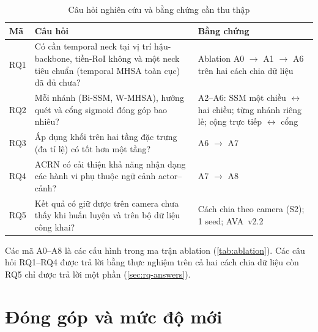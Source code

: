 \begin{table}[H]
\centering
\caption{Câu hỏi nghiên cứu và bằng chứng cần thu thập}
\label{tab:rq}
\begin{tabularx}{\textwidth}{lXX}
\toprule
\textbf{Mã} & \textbf{Câu hỏi} & \textbf{Bằng chứng}\\
\midrule
RQ1 & Có cần temporal neck tại vị trí hậu-backbone, tiền-RoI không và một neck tiêu chuẩn (temporal MHSA toàn cục) đã đủ chưa? & Ablation A0 $\rightarrow$ A1 $\rightarrow$ A6 trên hai cách chia dữ liệu\\
RQ2 & Mỗi nhánh (Bi-SSM, W-MHSA), hướng quét và cổng sigmoid đóng góp bao nhiêu? & A2--A6: SSM một chiều $\leftrightarrow$ hai chiều; từng nhánh riêng lẻ; cộng trực tiếp $\leftrightarrow$ cổng\\
RQ3 & Áp dụng khối trên hai tầng đặc trưng (đa tỉ lệ) có tốt hơn một tầng? & A6 $\rightarrow$ A7\\
RQ4 & ACRN có cải thiện khả năng nhận dạng các hành vi phụ thuộc ngữ cảnh actor--cảnh? & A7 $\rightarrow$ A8\\
RQ5 & Kết quả có giữ được trên camera chưa thấy khi huấn luyện và trên bộ dữ liệu công khai? & Cách chia theo camera (S2); 1 seed; AVA~v2.2\\
\bottomrule
\end{tabularx}
\end{table}

Các mã A0--A8 là các cấu hình trong ma trận ablation (\cref{tab:ablation}). Các câu hỏi RQ1--RQ4 được trả lời bằng thực nghiệm trên cả hai cách chia dữ liệu còn RQ5 chỉ được trả lời một phần (\cref{sec:rq-answers}).

\section{Đóng góp và mức độ mới}
\label{sec:novelty}


